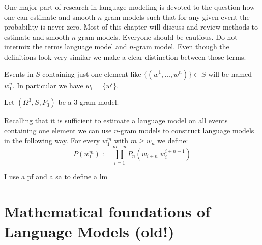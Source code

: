 \documentclass[•]{book}
\begin{document}
One major part of research in language modeling is devoted to the question how one can estimate and smooth $n$-gram models such that for any given event the probability is never zero. 
Most of this chapter will discuss and review methods to estimate and smooth $n$-gram models. 
Everyone should be cautious. 
Do not intermix the terms language model and $n$-gram model.
Even though the definitions look very similar we make a clear distinction between those terms. 

\begin{definition}
Events in  $S$ containing just one element like $\{(w^1,\dots,w^n)\}\subset S$ will be named $w_1^n$. 
In particular we have $w_i=\{w^i\}$.
\end{definition}
\begin{example}
Let $(\Omega^3,S,P_3)$ be a $3$-gram model. 
\end{example}

\begin{example}
Recalling that it is sufficient to estimate a language model on all events containing one element we can use $n$-gram models to construct language models in the following way. 
For every $w_1^m$ with $m\ge w_n$ we define:
\begin{equation}\label{eq:standardLanguageModel}
P(w_1^m):=\prod_{i=1}^{m-n}P_n(w_{i+n}|w_i^{i+n-1})
\end{equation}
\end{example}



I use a \gls{pf} and a \gls{sa} to define a \gls{lm}

\printnoidxglossaries

\chapter{Mathematical foundations of Language Models (old!)}
\end{document}
